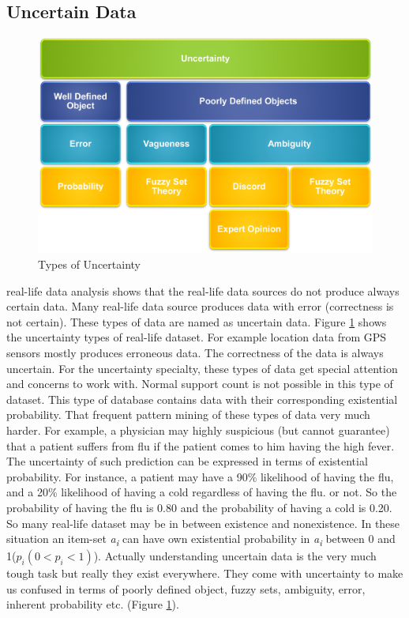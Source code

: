 \subsection{Uncertain Data}
\begin{figure}
\centering
  \includegraphics[width=.9\textwidth]{images/uncertainity_type.jpg}
\caption{Types of Uncertainty}
\label{figure:uncertainity_type}
\end{figure}
real-life data analysis shows that the real-life data sources do not produce always certain data. Many real-life data source produces data with error (correctness is not certain). These types of data are named as uncertain data. Figure \ref{figure:uncertainity_type} shows the uncertainty types of real-life dataset. For example location data from GPS sensors mostly produces erroneous data. The correctness of the data is always uncertain. For the uncertainty specialty, these types of data get special attention and concerns to work with. Normal support count is not possible in this type of dataset. This type of database contains data with their corresponding existential probability. That frequent pattern mining of these types of data very much harder. For example, a physician may highly suspicious (but cannot guarantee) that a patient suffers from flu if the patient comes to him having the high fever. The uncertainty of such prediction can be expressed in terms of existential probability. For instance, a patient may have a 90\% likelihood of having the flu, and a 20\% likelihood of having a cold regardless of having the flu. or not. So the probability of having the flu is 0.80 and the probability of having a cold is 0.20. So many real-life dataset may be in between existence and nonexistence. In these situation an item-set \emph{a\textsubscript{i}} can have own existential probability in \emph{a\textsubscript{i}} between 0 and 1($p_i(0<p_i<1)$). Actually understanding uncertain data is the very much tough task but really they exist everywhere. They come with uncertainty to make us confused in terms of poorly defined object, fuzzy sets, ambiguity, error, inherent probability etc. (Figure \ref{figure:uncertainity_type}).\\
